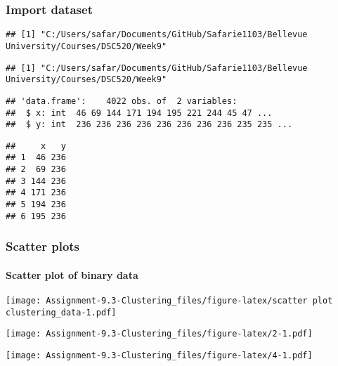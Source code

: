 \documentclass[
]{article}
\begin{document}
\hypertarget{import-dataset}{%
\subsubsection{Import dataset}\label{import-dataset}}

\begin{verbatim}
## [1] "C:/Users/safar/Documents/GitHub/Safarie1103/Bellevue University/Courses/DSC520/Week9"
\end{verbatim}

\begin{verbatim}
## [1] "C:/Users/safar/Documents/GitHub/Safarie1103/Bellevue University/Courses/DSC520/Week9"
\end{verbatim}

\begin{verbatim}
## 'data.frame':    4022 obs. of  2 variables:
##  $ x: int  46 69 144 171 194 195 221 244 45 47 ...
##  $ y: int  236 236 236 236 236 236 236 236 235 235 ...
\end{verbatim}

\begin{verbatim}
##     x   y
## 1  46 236
## 2  69 236
## 3 144 236
## 4 171 236
## 5 194 236
## 6 195 236
\end{verbatim}

\hypertarget{scatter-plots}{%
\subsubsection{Scatter plots}\label{scatter-plots}}

\hypertarget{scatter-plot-of-binary-data}{%
\paragraph{Scatter plot of binary
data}\label{scatter-plot-of-binary-data}}

\texttt{[image: Assignment-9.3-Clustering\_files/figure-latex/scatter plot clustering\_data-1.pdf]}

\texttt{[image: Assignment-9.3-Clustering\_files/figure-latex/2-1.pdf]}

\texttt{[image: Assignment-9.3-Clustering\_files/figure-latex/4-1.pdf]}
\end{document}
